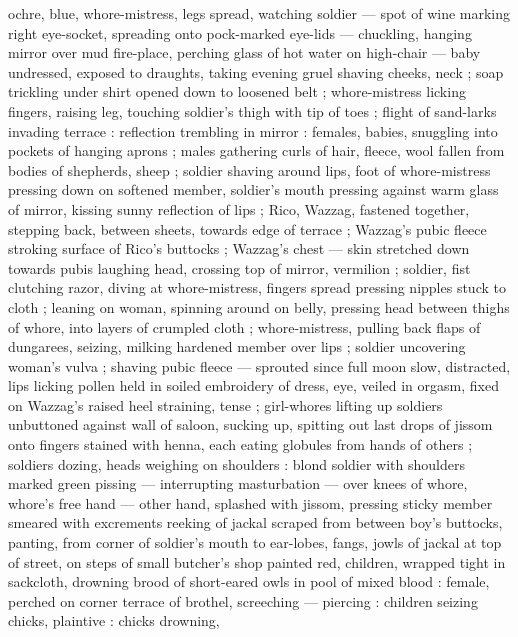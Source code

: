 ochre, blue, whore-mistress, legs spread, watching soldier --- spot of wine marking right
eye-socket, spreading onto pock-marked eye-lids --- chuckling, hanging mirror over mud fire-place,
perching glass of hot water on high-chair --- baby undressed, exposed to draughts, taking evening
gruel {\dashcom} shaving cheeks, neck ; soap trickling under shirt opened down to loosened belt ;
whore-mistress licking fingers, raising leg, touching soldier's thigh with tip of toes{\td}
 ; flight of sand-larks invading terrace : reflection trembling in mirror :
females, babies, snuggling into pockets of hanging aprons ; males gathering curls of hair, fleece,
wool fallen from bodies of shepherds, sheep ; soldier shaving around lips, foot of whore-mistress
pressing down on softened member, soldier's mouth pressing against warm %
glass of mirror, kissing sunny reflection of lips ; Rico, Wazzag, fastened together, stepping back,
between sheets, towards edge of terrace ; Wazzag's pubic fleece stroking surface of Rico's buttocks
; Wazzag's chest --- skin stretched down towards pubis {\dashcom} laughing head, crossing top of
mirror, vermilion ; soldier, fist clutching razor, diving at whore-mistress, fingers spread pressing
nipples stuck to cloth ; leaning on woman, spinning around on belly, pressing head between thighs of
whore, into layers of crumpled cloth ; whore-mistress, pulling back flaps of dungarees, seizing,
milking hardened member over lips ; soldier uncovering woman's vulva ; shaving pubic fleece ---
sprouted since full moon {\dashcom} slow, distracted, lips licking pollen held in soiled embroidery
of dress, eye, veiled in orgasm, fixed on Wazzag's raised heel straining, tense ; girl-whores
lifting up soldiers unbuttoned against wall of saloon, sucking up, spitting out last drops of jissom
onto fingers stained with henna, each eating globules from hands of others ; soldiers dozing, heads
weighing on shoulders : blond soldier with shoulders marked green pissing --- interrupting
masturbation --- over knees of whore, whore's free hand --- other hand, splashed with jissom,
pressing sticky member {\dashcom} smeared with excrements reeking of jackal scraped from between
boy's buttocks, panting, from corner of soldier's mouth to ear-lobes, fangs, jowls of jackal
{\semislash} at top of street, on steps of small butcher's shop painted red, children, wrapped tight
in sackcloth, drowning brood of short-eared owls in pool of mixed blood : female, perched on corner
terrace of brothel, screeching --- piercing : children seizing chicks, plaintive : chicks drowning,
